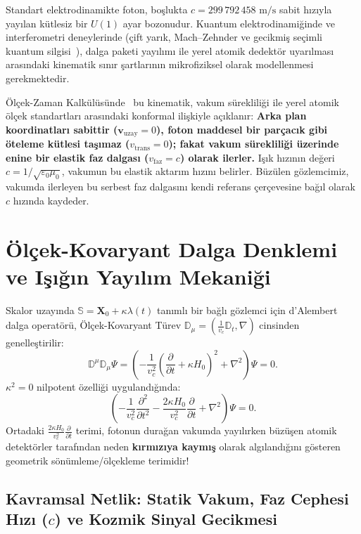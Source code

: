 \documentclass[11pt,a4paper]{article}
\begin{document}
Standart elektrodinamikte foton, boşlukta $c = 299\,792\,458\text{ m/s}$ sabit hızıyla yayılan kütlesiz bir $U(1)$ ayar bozonudur. Kuantum elektrodinamiğinde ve interferometri deneylerinde (çift yarık, Mach--Zehnder ve gecikmiş seçimli kuantum silgisi~\cite{scully1982,kim2000}), dalga paketi yayılımı ile yerel atomik dedektör uyarılması arasındaki kinematik sınır şartlarının mikrofiziksel olarak modellenmesi gerekmektedir.

Ölçek-Zaman Kalkülüsünde~\cite{scale_calculus} bu kinematik, vakum sürekliliği ile yerel atomik ölçek standartları arasındaki konformal ilişkiyle açıklanır: \textbf{Arka plan koordinatları sabittir ($\mathbf{v}_{\mathrm{uzay}} = 0$), foton maddesel bir parçacık gibi öteleme kütlesi taşımaz ($v_{\mathrm{trans}} = 0$); fakat vakum sürekliliği üzerinde enine bir elastik faz dalgası ($v_{\mathrm{faz}} = c$) olarak ilerler.} Işık hızının değeri $c = 1/\sqrt{\varepsilon_0\mu_0}$, vakumun bu elastik aktarım hızını belirler. Büzülen gözlemcimiz, vakumda ilerleyen bu serbest faz dalgasını kendi referans çerçevesine bağıl olarak $c$ hızında kaydeder.

\section{Ölçek-Kovaryant Dalga Denklemi ve Işığın Yayılım Mekaniği}
\label{sec:dalga_denklemi}

Skalor uzayında $\mathbb{S} = \mathbf{X}_0 + \kappa \lambda(t)$ tanımlı bir bağlı gözlemci için d'Alembert dalga operatörü, Ölçek-Kovaryant Türev $\mathbb{D}_\mu = (\frac{1}{v_c}\mathbb{D}_t, \nabla)$ cinsinden genelleştirilir:
\begin{equation}
    \mathbb{D}^\mu \mathbb{D}_\mu \Psi = \left( -\frac{1}{v_c^2} \left(\frac{\partial}{\partial t} + \kappa H_0\right)^2 + \nabla^2 \right) \Psi = 0.
    \label{eq:dalga_op}
\end{equation}
$\kappa^2 = 0$ nilpotent özelliği uygulandığında:
\begin{equation}
    \left( -\frac{1}{v_c^2} \frac{\partial^2}{\partial t^2} - \frac{2\kappa H_0}{v_c^2} \frac{\partial}{\partial t} + \nabla^2 \right) \Psi = 0.
    \label{eq:acik_dalga_tr}
\end{equation}
Ortadaki $\frac{2\kappa H_0}{v_c^2} \frac{\partial}{\partial t}$ terimi, fotonun durağan vakumda yayılırken büzüşen atomik detektörler tarafından neden \textbf{kırmızıya kaymış} olarak algılandığını gösteren geometrik sönümleme/ölçekleme terimidir!

\subsection{Kavramsal Netlik: Statik Vakum, Faz Cephesi Hızı (\texorpdfstring{$c$}{c}) ve Kozmik Sinyal Gecikmesi}
\label{sec:kavramsal_netlik_isik}
\end{document}
